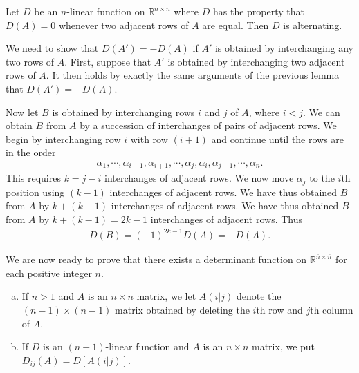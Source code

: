 \documentclass[12pt,letterpaper,reqno]{article}
\numberwithin{equation}{section}
\newcommand{\fixme}[1]{{\color{orange}{[#1]}}}
\begin{document}
\begin{lem}[$D(A)=0$ implies alternating for $n$-linear functions]
	Let $D$ be an $n$-linear function on $\mathbb{R}^{\overline{n} \times \overline{n}}$ where $D$ has the property that $D(A)=0$ whenever two adjacent rows of $A$ are equal. Then $D$ is alternating.
\end{lem}

\begin{pf}
We need to show that $D(A')=-D(A)$ if $A'$ is obtained by interchanging any two rows of $A$. First, suppose that $A'$ is obtained by interchanging two adjacent rows of $A$. It then holds by exactly the same arguments of the previous lemma that $D(A')=-D(A)$.

Now let $B$ is obtained by interchanging rows $i$ and $j$ of $A$, where $i<j$. We can obtain $B$ from $A$ by a succession of interchanges of pairs of adjacent rows. We begin by interchanging row $i$ with row $(i+1)$ and continue until the rows are in the order
\begin{align*}
	\alpha_1,\cdots,\alpha_{i-1},\alpha_{i+1},\cdots,\alpha_j,\alpha_i,\alpha_{j+1},\cdots,\alpha_n.
\end{align*}
This requires $k=j-i$ interchanges of adjacent rows. We now move $\alpha_j$ to the $i$th position using $(k-1)$ interchanges of adjacent rows. We have thus obtained $B$ from $A$ by $k+(k-1)$ interchanges of adjacent rows. We have thus obtained $B$ from $A$ by $k+(k-1)=2k-1$ interchanges of adjacent rows. Thus
\begin{align*}
	D(B)=(-1)^{2k-1}D(A)=-D(A).
\end{align*}	
\end{pf}

We are now ready to prove that there exists a determinant function on $\mathbb{R}^{\overline{n} \times \overline{n}}$ for each positive integer $n$. 

\begin{defn}[\fixme{Need label.}]
\begin{enumerate}[(a)] \hspace{10cm}
	\item If $n>1$ and $A$ is an $n \times n$ matrix, we let $A(i\vert j)$ denote the $(n-1) \times (n-1)$ matrix obtained by deleting the $i$th row and $j$th column of $A$.
	\item If $D$ is an $(n-1)$-linear function and $A$ is an $n \times n$ matrix, we put $D_{ij}(A)=D[A(i \vert j)]$.
\end{enumerate}
\end{defn}
\end{document}
